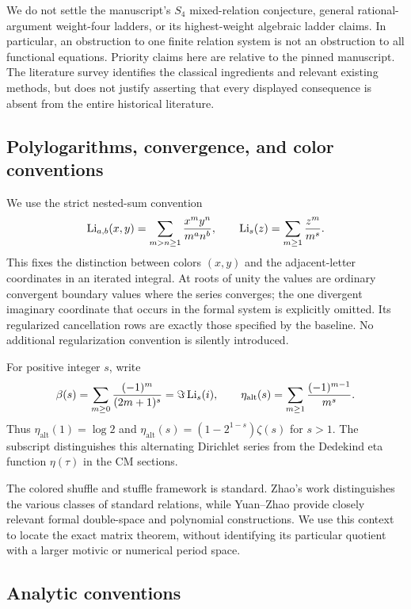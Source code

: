 We do not settle the manuscript's $S_4$ mixed-relation conjecture, general
rational-argument weight-four ladders, or its highest-weight algebraic
ladder claims. In particular, an obstruction to one finite relation system
is not an obstruction to all functional equations. Priority claims here
are relative to the pinned manuscript. The literature survey identifies
the classical ingredients and relevant existing methods, but does not
justify asserting that every displayed consequence is absent from the
entire historical literature.

\subsection{Polylogarithms, convergence, and color conventions}

We use the strict nested-sum convention
\begin{equation}\label{eq:depth-two-convention}
 \operatorname{Li}_{a,b}(x,y)=\sum_{m>n\ge1}\frac{x^m y^n}{m^a n^b},
 \qquad \operatorname{Li}_s(z)=\sum_{m\ge1}\frac{z^m}{m^s}.
\end{equation}
This fixes the distinction between colors $(x,y)$ and the adjacent-letter
coordinates in an iterated integral. At roots of unity the values are
ordinary convergent boundary values where the series converges; the one
divergent imaginary coordinate that occurs in the formal system is
explicitly omitted. Its regularized cancellation rows are exactly those
specified by the baseline. No additional regularization convention is
silently introduced.

For positive integer $s$, write
\[
 \beta(s)=\sum_{m\ge0}\frac{(-1)^m}{(2m+1)^s}
          =\Im\operatorname{Li}_s(i),\qquad
 \eta_{\mathrm{alt}}(s)=\sum_{m\ge1}\frac{(-1)^{m-1}}{m^s}.
\]
Thus $\eta_{\mathrm{alt}}(1)=\log2$ and
$\eta_{\mathrm{alt}}(s)=(1-2^{1-s})\zeta(s)$ for $s>1$.
The subscript distinguishes this alternating Dirichlet series from the
Dedekind eta function $\eta(\tau)$ in the CM sections.

The colored shuffle and stuffle framework is standard. Zhao's work
\cite{Zhao} distinguishes the various classes of standard relations,
while Yuan--Zhao \cite{YuanZhao} provide closely relevant formal
double-space and polynomial constructions. We use this context to locate
the exact matrix theorem, without identifying its particular quotient
with a larger motivic or numerical period space.

\subsection{Analytic conventions}

